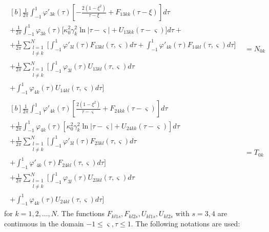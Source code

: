 \begin{equation} \label{PopovEq123113} 
	\begin{aligned}
		\begin{multlined}[b]
			\frac{1}{2\pi } \int _{-1}^{1}\varphi '_{3k} (\tau ) \left[-\frac{2\left(1-\xi ^{2} \right)}{\tau -\xi } +F_{13kk} (\tau -\xi )\right]d\tau 
			\\
			+\frac{1}{2\pi } \int _{-1}^{1}\varphi _{3k} (\tau ) \Big[\kappa _{0}^{2} \gamma _{k}^{2} \ln \left|\tau -\varsigma \right|+U_{13kk} (\tau -\varsigma)\Big]d\tau +
			\\
			+\frac{1}{2\pi }\sum _{\substack{l=1 \\l\ne k}}^{N}\Bigg[ \int _{-1}^{1}\varphi '_{3l} (\tau )F_{13kl} (\tau ,\varsigma )d\tau 
			+ \int _{-1}^{1}\varphi '_{4k} (\tau )F_{14kl} (\tau ,\varsigma ) d\tau  \Bigg] 
			\\
			+\frac{1}{2\pi }\sum_{\substack{l=1 \\ l\ne k}}^{N}\Bigg[ \int _{-1}^{1}\varphi _{3l} (\tau )U_{13kl} (\tau ,\varsigma )d\tau 
			\\
			+ \int _{-1}^{1}\varphi _{4k} (\tau )U_{14kl} (\tau ,\varsigma ) d\tau  \Bigg] 
		\end{multlined}&=N_{0k}  
		\\
		\begin{multlined}[b]
			\frac{1}{2\pi } \int_{-1}^{1}\varphi '_{4k} (\tau ) \left[\frac{2\left(1-\xi ^{2} \right)}{\tau -\varsigma } +F_{24kk} \left(\tau -\varsigma \right)\right]d\tau
			\\
			+\frac{1}{2\pi } \int_{-1}^{1}\varphi _{4k} (\tau ) \left[\kappa _{0}^{2} \gamma _{k}^{2} \ln \left|\tau -\varsigma \right|+U_{24kk} (\tau -\varsigma)\right]d\tau 
			\\
			+\frac{1}{2\pi }\sum_{\substack{l=1 \\l\ne k}}^{N}\Bigg[ \int _{-1}^{1}\varphi '_{3l} (\tau )F_{23kl} (\tau ,\varsigma )d\tau 
			\\
			+ \int _{-1}^{1}\varphi '_{4k} (\tau )F_{24kl} (\tau ,\varsigma ) d\tau  \Bigg] 
			\\
			+\frac{1}{2\pi }\sum_{\substack{l=1 \\l\ne k}}^{N}\Bigg[ \int _{-1}^{1}\varphi _{3l} (\tau )U_{23kl} (\tau ,\varsigma )d\tau 
			\\
			+\int _{-1}^{1}\varphi _{4k} (\tau )U_{24kl} (\tau ,\varsigma ) d\tau  \Bigg] 
		\end{multlined}&=T_{0k} 
	\end{aligned}
\end{equation} 
for \( k = 1, 2, \dots, N \). The functions \( F_{kl1s}, F_{kl2s}, U_{kl1s}, U_{kl2s} \) with \( s = 3, 4 \) are continuous in the domain \( -1 \le \varsigma, \tau \le 1 \). The following notations are used:

